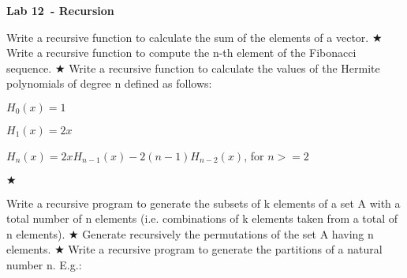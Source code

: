 \documentclass{exam}
\newcommand\labnr{12}
\newcommand\lab{Lab \labnr\ - Recursion}
\newcommand\lvlez{$\bigstar$}
\begin{document}
\begin{center}
   \vspace*{0cm}
   \bfseries\LARGE
   \lab
   \vspace*{1cm}
\end{center}

\begin{questions}
  \question Write a recursive function to calculate the sum of the elements of a vector. \lvlez
  \question Write a recursive function to compute the n-th element of the Fibonacci sequence. \lvlez
  \question Write a recursive function to calculate the values of the Hermite polynomials of degree n defined as follows:

$H_0(x) = 1$

$H_1(x) = 2x$

  $H_n(x) = 2xH_{n-1}(x)-2(n-1)H_{n-2}(x)$, for $n>=2$

\lvlez

  \question Write a recursive program to generate the subsets of k elements of a set A with a total number of n elements (i.e. combinations of k elements taken from a total of n elements). \lvlez
  \question Generate recursively the permutations of the set A having n elements. \lvlez
  \question Write a recursive program to generate the partitions of a natural number
n. E.g.:


\end{questions}
\end{document}
